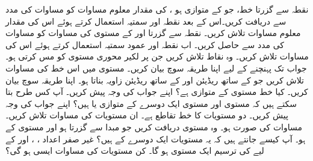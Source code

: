 نقطہ  سے گزرتا خط،  جو  کے متوازی ہو ، کی مقدار معلوم مساوات   کو مساوات  کی مدد سے  دریافت کریں۔اس کے بعد نقطہ  اور سمتیہ  استعمال کرتے ہوئے اس کی مقدار معلوم مساوات تلاش کریں۔
نقطہ  سے گزرتا اور  کے  مستوی کی مساوات کو  مساوات کی مدد سے حاصل کریں۔ اب نقطہ  اور عمود سمتیہ  استعمال کرتے ہوئے اس کی مساوات تلاش کریں۔
وہ نقاط تلاش کریں جن پر لکیر  محوری مستوی کو مس کرتی ہو۔ جواب تک پہنچنے کے لیے اپنا طریقہ      سوچ بیان کریں۔
مستوی   میں اس خط کی مساوات تلاش کریں جو  کے ساتھ  ریڈیئن اور  کے ساتھ  ریڈیئن زاویہ بناتا ہو۔ اپنا طریقہ سوچ بیان کریں۔
کیا خط  مستوی   کے متوازی ہے؟ اپنے جواب کی وجہ پیش کریں۔
آپ کس طرح بتا سکتے ہیں کہ مستوی   اور مستوی  ایک دوسرے کے متوازی  یا  ہیں؟ اپنے جواب کی وجہ پیش کریں۔
دو مستویات  کا خط تقاطع  ہے۔  ان مستویات  کی مساوات تلاش کریں۔ مساوات کی صورت  ہو۔
وہ مستوی دریافت کریں جو مبدا سے گزرتا ہو اور مستوی   کے   ہو۔ آپ کیسے جانتے ہیں کہ یہ مستویات ایک دوسرے کے   ہیں؟
غیر صفر اعداد ، ،  اور  کے لیے  کی ترسیم ایک مستوی  ہو گا۔ کن مستویات کی مساوات ایسی ہو گی؟
